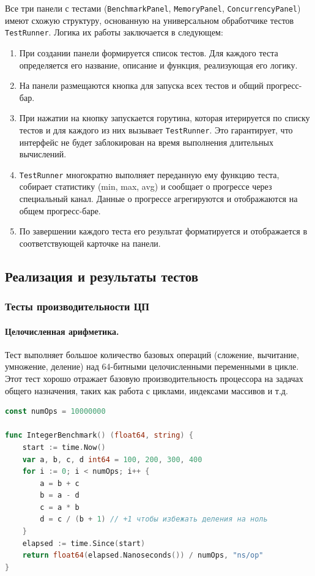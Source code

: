Все три панели с тестами (\texttt{BenchmarkPanel}, \texttt{MemoryPanel}, \texttt{ConcurrencyPanel}) имеют схожую структуру, основанную на универсальном обработчике тестов \texttt{TestRunner}. Логика их работы заключается в следующем:
\begin{enumerate}
    \item При создании панели формируется список тестов. Для каждого теста определяется его название, описание и функция, реализующая его логику.
    \item На панели размещаются кнопка для запуска всех тестов и общий прогресс-бар.
    \item При нажатии на кнопку запускается горутина, которая итерируется по списку тестов и для каждого из них вызывает \texttt{TestRunner}. Это гарантирует, что интерфейс не будет заблокирован на время выполнения длительных вычислений.
    \item \texttt{TestRunner} многократно выполняет переданную ему функцию теста, собирает статистику (min, max, avg) и сообщает о прогрессе через специальный канал. Данные о прогрессе агрегируются и отображаются на общем прогресс-баре.
    \item По завершении каждого теста его результат форматируется и отображается в соответствующей карточке на панели.
\end{enumerate}

\subsection{Реализация и результаты тестов}

\subsubsection{Тесты производительности ЦП}

\paragraph{Целочисленная арифметика.} Тест выполняет большое количество базовых операций (сложение, вычитание, умножение, деление) над 64-битными целочисленными переменными в цикле. Этот тест хорошо отражает базовую производительность процессора на задачах общего назначения, таких как работа с циклами, индексами массивов и т.д.

\begin{lstlisting}[language=Go, caption={Реализация теста целочисленной арифметики}]
const numOps = 10000000

func IntegerBenchmark() (float64, string) {
	start := time.Now()
	var a, b, c, d int64 = 100, 200, 300, 400
	for i := 0; i < numOps; i++ {
		a = b + c
		b = a - d
		c = a * b
		d = c / (b + 1) // +1 чтобы избежать деления на ноль
	}
	elapsed := time.Since(start)
	return float64(elapsed.Nanoseconds()) / numOps, "ns/op"
}
\end{lstlisting}

